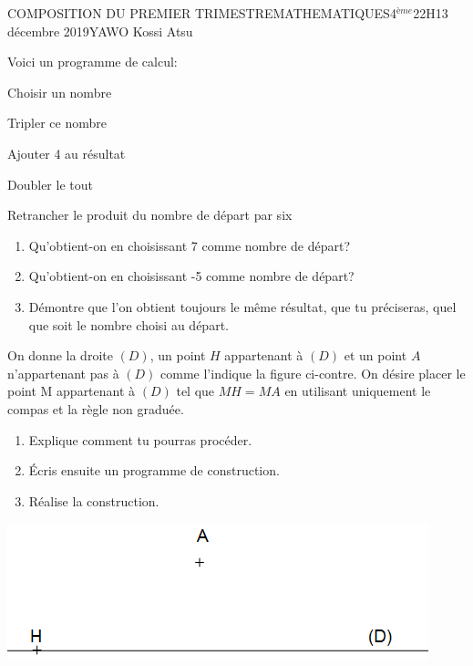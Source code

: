 \documentclass[12pt,a4paper]{book}
\newcommand{\prof}{YAWO Kossi Atsu}
\newcommand{\matiere}{MATHEMATIQUES}
\newcommand{\classe}{4$^{ème}$}
\begin{document}
\newpage
\begin{devoir}{COMPOSITION DU PREMIER TRIMESTRE}{\matiere}{\classe}{2}{2H}{13 décembre 2019}{\prof}
\begin{exo}[3]
\begin{multicols}{2}
Voici un programme de calcul:
\begin{remslist}
\item Choisir un nombre
\item Tripler ce nombre
\item Ajouter 4 au résultat
\item Doubler le tout
\item Retrancher le produit du nombre de départ par six
\end{remslist}
\begin{enumerate}
\item Qu'obtient-on en choisissant 7 comme nombre de départ?
\item Qu'obtient-on en choisissant -5 comme nombre de départ?
\item Démontre que l'on obtient toujours le même résultat, que tu préciseras, quel que soit le nombre choisi au départ.
\end{enumerate}
\end{multicols}
\end{exo}

\totalexo

\begin{exo}[3]
\begin{multicols}{2}
On donne la droite $(D)$, un point $H$ appartenant à $(D)$ et un point $A$
n'appartenant pas à $(D)$ comme l'indique la figure ci-contre.
On désire placer le point M appartenant à $(D)$ tel que $MH=MA$ en utilisant uniquement le compas et la règle non graduée.
\begin{enumerate}
\item Explique comment tu pourras procéder.
\item Écris ensuite un programme de construction.
\item Réalise la construction.
\end{enumerate}
\includegraphics[scale=0.4]{images/td1img1.png}
\end{multicols}
\end{exo}


\end{devoir}
\end{document}

